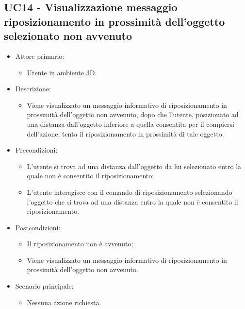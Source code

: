 \subsection{UC14 - Visualizzazione messaggio riposizionamento in prossimità dell'oggetto selezionato non avvenuto}
\begin{itemize}

	\item Attore primario: 
	\begin{itemize}
		\item Utente in ambiente 3D.
	\end{itemize}
	\item Descrizione:
	\begin{itemize}
		\item Viene visualizzato un messaggio informativo di riposizionamento in prossimità dell'oggetto non avvenuto, dopo che l'utente, posizionato ad
una distanza dall'oggetto inferiore a quella consentita per il compiersi dell'azione, tenta il riposizionamento in prossimità di tale oggetto.
	\end{itemize}
	
	\item Precondizioni:
	\begin{itemize}
		\item L'utente si trova ad una distanza dall'oggetto da lui selezionato entro la quale non è consentito il riposizionamento;
		\item L'utente interagisce con il comando di riposizionamento selezionando l'oggetto che si trova ad una distanza entro la quale non è consentito il riposizionamento.
	\end{itemize}
	
	\item Postcondizioni:
	\begin{itemize}
		\item Il riposizionamento non è avvenuto;
		\item Viene visualizzato un messaggio informativo di riposizionamento in prossimità dell'oggetto non avvenuto.
	\end{itemize}
	
	\item Scenario principale:
	\begin{itemize}
		\item Nessuna azione richiesta.
	\end{itemize}
	
\end{itemize}

